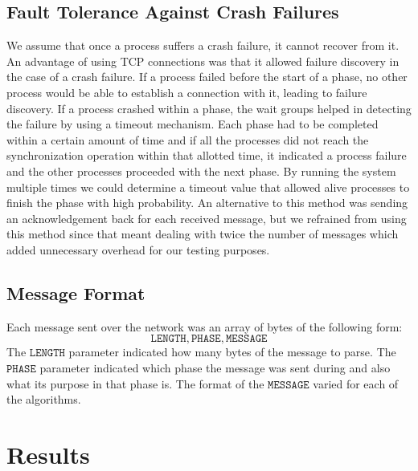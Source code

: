 \subsection{Fault Tolerance Against Crash Failures} We assume that once
a process suffers a crash failure, it cannot recover from it. An advantage of
using TCP connections was that it allowed failure discovery in the case of
a crash failure. If a process failed before the start of a phase, no other
process would be able to establish a connection with it, leading to failure
discovery. If a process crashed within a phase, the wait groups helped in
detecting the failure by using a timeout mechanism. Each phase had to be
completed within a certain amount of time and if all the processes did not
reach the synchronization operation within that allotted time, it indicated
a process failure and the other processes proceeded with the next phase. 
By running the system multiple times we could determine a timeout value
that allowed alive processes to finish the phase with high probability. 
An alternative to this method was sending an acknowledgement back for each
received message, but we refrained from using this method since that meant
dealing with twice the number of messages which added unnecessary overhead for
our testing purposes. 

\subsection{Message Format} Each message sent over the network was an array of
bytes of the following form: \begin{equation*} \mathtt{LENGTH}, \mathtt{PHASE},
    \mathtt{MESSAGE} \end{equation*} The $\mathtt{LENGTH}$ parameter indicated
    how many bytes of the message to parse. The $\mathtt{PHASE}$ parameter
    indicated which phase the message was sent during and also what its purpose
    in that phase is. 
The format of the $\mathtt{MESSAGE}$ varied for each of the algorithms.


\section{Results} \label{sec:results}

